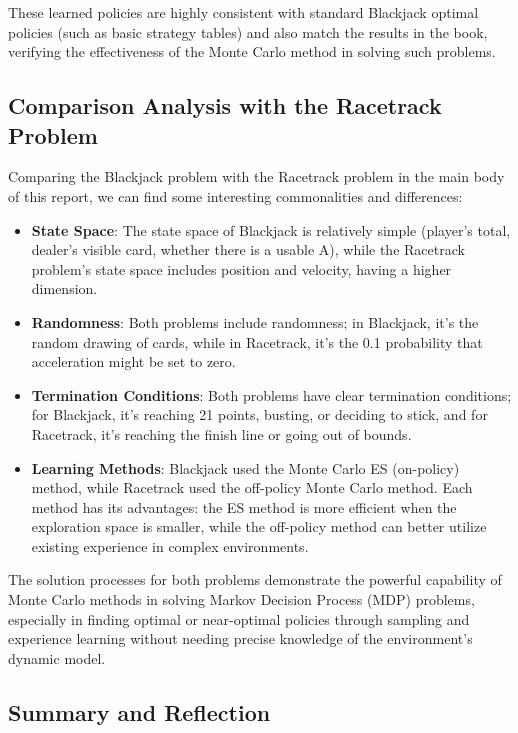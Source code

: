 \documentclass{article}
\begin{document}
These learned policies are highly consistent with standard Blackjack optimal policies (such as basic strategy tables) and also match the results in the book, verifying the effectiveness of the Monte Carlo method in solving such problems.

\subsection{Comparison Analysis with the Racetrack Problem}

Comparing the Blackjack problem with the Racetrack problem in the main body of this report, we can find some interesting commonalities and differences:

\begin{itemize}
    \item \textbf{State Space}: The state space of Blackjack is relatively simple (player's total, dealer's visible card, whether there is a usable A), while the Racetrack problem's state space includes position and velocity, having a higher dimension.
    
    \item \textbf{Randomness}: Both problems include randomness; in Blackjack, it's the random drawing of cards, while in Racetrack, it's the 0.1 probability that acceleration might be set to zero.
    
    \item \textbf{Termination Conditions}: Both problems have clear termination conditions; for Blackjack, it's reaching 21 points, busting, or deciding to stick, and for Racetrack, it's reaching the finish line or going out of bounds.
    
    \item \textbf{Learning Methods}: Blackjack used the Monte Carlo ES (on-policy) method, while Racetrack used the off-policy Monte Carlo method. Each method has its advantages: the ES method is more efficient when the exploration space is smaller, while the off-policy method can better utilize existing experience in complex environments.
\end{itemize}

The solution processes for both problems demonstrate the powerful capability of Monte Carlo methods in solving Markov Decision Process (MDP) problems, especially in finding optimal or near-optimal policies through sampling and experience learning without needing precise knowledge of the environment's dynamic model.

\subsection{Summary and Reflection}
\end{document}
